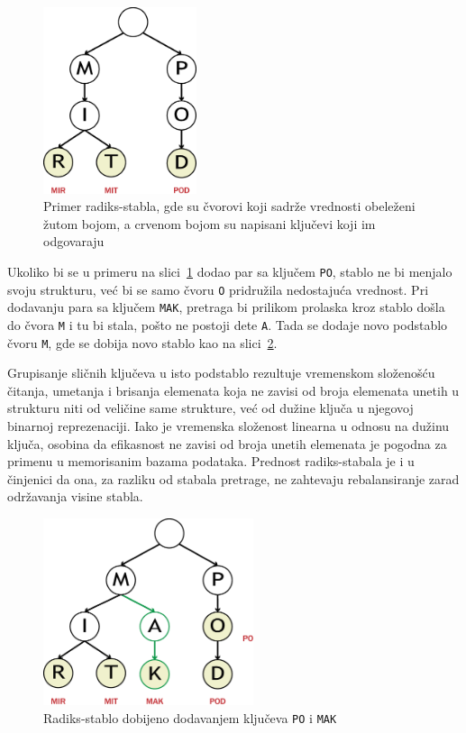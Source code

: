 \documentclass[12pt,oneside]{memoir}
\begin{document}
\begin{figure}[!h]
  \centering
  \includegraphics[width=0.40\textwidth]{radix_tree.eps}
  \caption{Primer radiks-stabla, gde su čvorovi koji sadrže vrednosti
    obeleženi žutom bojom, a crvenom bojom su napisani ključevi koji im
    odgovaraju}
  \label{fig:radix}
\end{figure}

Ukoliko bi se u primeru na
slici~\ref{fig:radix} dodao par sa ključem \texttt{PO},
stablo ne bi menjalo svoju strukturu, već
bi se samo čvoru \texttt{O} pridružila nedostajuća vrednost.
Pri dodavanju para sa ključem \texttt{MAK}, pretraga bi prilikom prolaska
kroz stablo došla do čvora \texttt{M} i tu bi stala,
pošto ne postoji dete \texttt{A}. Tada se dodaje novo podstablo
čvoru \texttt{M}, gde se dobija novo stablo kao na slici~\ref{fig:radix2}.


Grupisanje sličnih ključeva u
isto podstablo rezultuje vremenskom složenošću čitanja, umetanja i brisanja
elemenata koja ne zavisi od broja elemenata
unetih u strukturu niti od veličine same strukture, već od
dužine ključa u njegovoj binarnoj reprezenaciji. Iako je vremenska složenost linearna
u odnosu na dužinu ključa,
osobina da efikasnost ne zavisi od broja unetih elemenata je pogodna za primenu
u memorisanim bazama podataka. Prednost radiks-stabala je i u činjenici da ona,
za razliku od stabala pretrage, ne zahtevaju rebalansiranje zarad
održavanja visine stabla.

\begin{figure}[!h]
  \centering
  \includegraphics[width=0.55\textwidth]{radix_tree_2.eps}
  \caption{Radiks-stablo dobijeno dodavanjem ključeva \texttt{PO} i \texttt{MAK}}
  \label{fig:radix2}
\end{figure}
\end{document}
